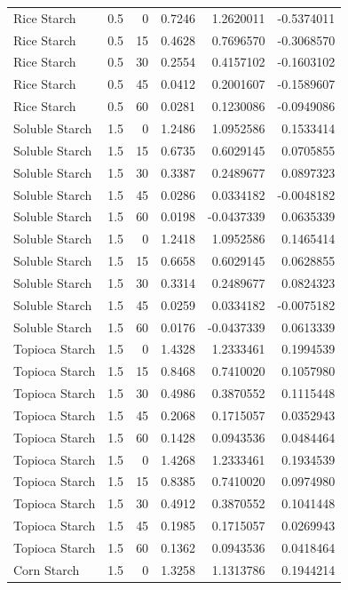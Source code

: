 \documentclass[
  12pt,
]{article}
\begin{document}
{\begin{longtable}[]{@{}lrrrrr@{}}
Rice Starch & 0.5 & 0 & 0.7246 & 1.2620011 & -0.5374011 \\
Rice Starch & 0.5 & 15 & 0.4628 & 0.7696570 & -0.3068570 \\
Rice Starch & 0.5 & 30 & 0.2554 & 0.4157102 & -0.1603102 \\
Rice Starch & 0.5 & 45 & 0.0412 & 0.2001607 & -0.1589607 \\
Rice Starch & 0.5 & 60 & 0.0281 & 0.1230086 & -0.0949086 \\
Soluble Starch & 1.5 & 0 & 1.2486 & 1.0952586 & 0.1533414 \\
Soluble Starch & 1.5 & 15 & 0.6735 & 0.6029145 & 0.0705855 \\
Soluble Starch & 1.5 & 30 & 0.3387 & 0.2489677 & 0.0897323 \\
Soluble Starch & 1.5 & 45 & 0.0286 & 0.0334182 & -0.0048182 \\
Soluble Starch & 1.5 & 60 & 0.0198 & -0.0437339 & 0.0635339 \\
Soluble Starch & 1.5 & 0 & 1.2418 & 1.0952586 & 0.1465414 \\
Soluble Starch & 1.5 & 15 & 0.6658 & 0.6029145 & 0.0628855 \\
Soluble Starch & 1.5 & 30 & 0.3314 & 0.2489677 & 0.0824323 \\
Soluble Starch & 1.5 & 45 & 0.0259 & 0.0334182 & -0.0075182 \\
Soluble Starch & 1.5 & 60 & 0.0176 & -0.0437339 & 0.0613339 \\
Topioca Starch & 1.5 & 0 & 1.4328 & 1.2333461 & 0.1994539 \\
Topioca Starch & 1.5 & 15 & 0.8468 & 0.7410020 & 0.1057980 \\
Topioca Starch & 1.5 & 30 & 0.4986 & 0.3870552 & 0.1115448 \\
Topioca Starch & 1.5 & 45 & 0.2068 & 0.1715057 & 0.0352943 \\
Topioca Starch & 1.5 & 60 & 0.1428 & 0.0943536 & 0.0484464 \\
Topioca Starch & 1.5 & 0 & 1.4268 & 1.2333461 & 0.1934539 \\
Topioca Starch & 1.5 & 15 & 0.8385 & 0.7410020 & 0.0974980 \\
Topioca Starch & 1.5 & 30 & 0.4912 & 0.3870552 & 0.1041448 \\
Topioca Starch & 1.5 & 45 & 0.1985 & 0.1715057 & 0.0269943 \\
Topioca Starch & 1.5 & 60 & 0.1362 & 0.0943536 & 0.0418464 \\
Corn Starch & 1.5 & 0 & 1.3258 & 1.1313786 & 0.1944214 \\

\end{longtable}}
\end{document}
